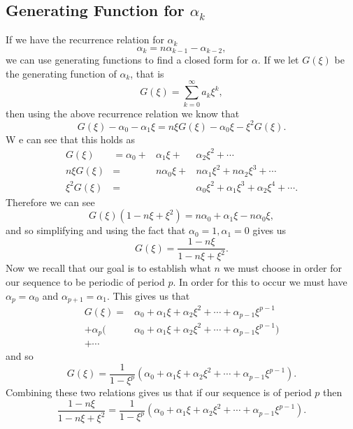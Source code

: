 \documentclass[12pt]{article}
\begin{document}
\subsection{Generating Function for $\alpha_k$}
If we have the recurrence relation for $\alpha_k$ 
\begin{equation*}
\alpha_k = n \alpha_{k-1} - \alpha_{k-2}, 
\end{equation*}
we can use generating functions to find a closed form for $\alpha$. If we let $G(\xi)$ be the generating function of $\alpha_k$, that is 
\begin{equation*}
G(\xi) = \sum_{k=0}^{\infty} a_k \xi^k,
\end{equation*}
then using the above recurrence relation we know that 
\begin{equation*}
G(\xi) -\alpha_0 - \alpha_1 \xi = n \xi G(\xi) - \alpha_0 \xi - \xi^2 G(\xi).
\end{equation*}
W e can see that this holds as 
\begin{align*}
G(\xi) &= \alpha_0 + &\alpha_1 \xi + &\alpha_2 \xi^2 + \cdots \\
n \xi G(\xi) &= &n\alpha_0 \xi + &n\alpha_1 \xi^2 + n\alpha_2 \xi^3 + \cdots \\
\xi^2 G(\xi) &= &&\alpha_0 \xi^2 + \alpha_1 \xi^3 + \alpha_2 \xi^4 + \cdots.
\end{align*}
Therefore we can see 
\begin{equation*}
G( \xi) (1-n \xi + \xi^2) = n\alpha_0 + \alpha_1 \xi - n\alpha_0 \xi,
\end{equation*}
and so simplifying and using the fact that $\alpha_0=1, \alpha_1=0$ gives us 
\begin{equation*}
G(\xi) = \frac{ 1 - n\xi}{1 - n \xi + \xi^2} .
\end{equation*}
Now we recall that our goal is to establish what $n$ we must choose in order for our sequence to be periodic of period $p$. In order for this to occur we must have $\alpha_p= \alpha_0$ and $\alpha_{p+1} = \alpha_1$. This gives us that 
\begin{align*}
G(\xi) = &\alpha_0 + \alpha_1 \xi + \alpha_2 \xi^2 + \cdots + \alpha_{p-1} \xi^{p-1} \\
+ \alpha_p(&\alpha_0 + \alpha_1 \xi + \alpha_2 \xi^2 + \cdots + \alpha_{p-1} \xi^{p-1}) \\ 
+ \cdots 
\end{align*}
and so 
\begin{equation*}
G(\xi) = \frac{1}{1- \xi^p} (\alpha_0 + \alpha_1 \xi + \alpha_2 \xi^2 + \cdots + \alpha_{p-1} \xi^{p-1}).
\end{equation*}
Combining these two relations gives us that if our sequence is of period $p$ then 
\begin{equation*}
\frac{ 1 - n\xi}{1 - n \xi + \xi^2} = \frac{1}{1- \xi^p} (\alpha_0 + \alpha_1 \xi + \alpha_2 \xi^2 + \cdots + \alpha_{p-1} \xi^{p-1}).
\end{equation*}
\end{document}
